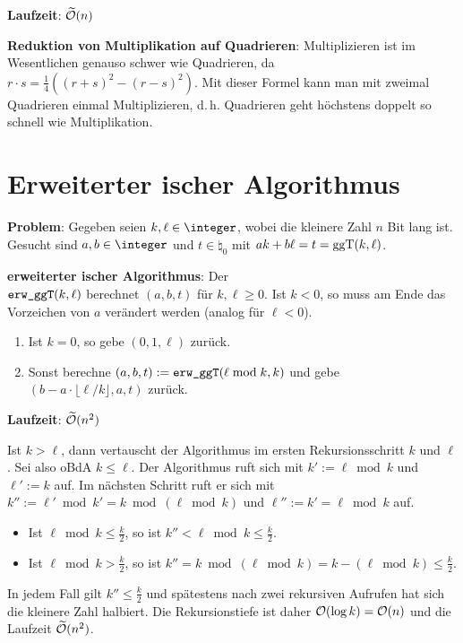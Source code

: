 \textbf{Laufzeit}:
$\widetilde{\mathcal{O}}(n)$

\linie

\textbf{Reduktion von Multiplikation auf Quadrieren}:
Multiplizieren ist im Wesentlichen genauso schwer wie Quadrieren,
da $r \cdot s = \frac{1}{4} ((r + s)^2 - (r - s)^2)$.
Mit dieser Formel kann man mit zweimal Quadrieren einmal Multiplizieren,
d.\,h. Quadrieren geht höchstens doppelt so schnell wie Multiplikation.

\section{%
    Erweiterter ischer Algorithmus%
}

\textbf{Problem}:
Gegeben seien $k, \ell \in \integer$, wobei die kleinere Zahl $n$ Bit lang ist.\\
Gesucht sind $a, b \in \integer$ und $t \in \natural_0$ mit
$ak + b\ell = t = \operatorname{ggT}(k, \ell)$.

\textbf{erweiterter ischer Algorithmus}:
Der \\
$\texttt{erw\_ggT}(k, \ell)$
berechnet $(a, b, t)$ für $k, \ell \ge 0$.
Ist $k < 0$, so muss am Ende das Vorzeichen von $a$ verändert werden
(analog für $\ell < 0$).
\begin{enumerate}
    \item
    Ist $k = 0$, so gebe $(0, 1, \ell)$ zurück.

    \item
    Sonst berechne $(a, b, t) := \texttt{erw\_ggT}(\ell \bmod k, k)$
    und gebe $(b - a \cdot \lfloor \ell/k \rfloor, a, t)$ zurück.
\end{enumerate}

\textbf{Laufzeit}:
$\widetilde{\mathcal{O}}(n^2)$

\begin{Beweis}
    Ist $k > \ell$, dann vertauscht der Algorithmus im ersten Rekursionsschritt $k$ und $\ell$.
    Sei also oBdA $k \le \ell$.
    Der Algorithmus ruft sich mit $k' := \ell \bmod k$ und $\ell' := k$ auf.
    Im nächsten Schritt ruft er sich mit $k'' := \ell' \bmod k' = k \bmod (\ell \bmod k)$ und
    $\ell'' := k' = \ell \bmod k$ auf.
    \begin{itemize}
        \item
        Ist $\ell \bmod k \le \frac{k}{2}$, so ist $k'' < \ell \bmod k \le \frac{k}{2}$.

        \item
        Ist $\ell \bmod k > \frac{k}{2}$, so ist
        $k'' = k \bmod (\ell \bmod k) = k - (\ell \bmod k) \le \frac{k}{2}$.
    \end{itemize}
    In jedem Fall gilt $k'' \le \frac{k}{2}$ und spätestens nach zwei rekursiven Aufrufen hat
    sich die kleinere Zahl halbiert.
    Die Rekursionstiefe ist daher $\mathcal{O}(\log k) = \mathcal{O}(n)$ und die Laufzeit $\widetilde{\mathcal{O}}(n^2)$.
\end{Beweis}

